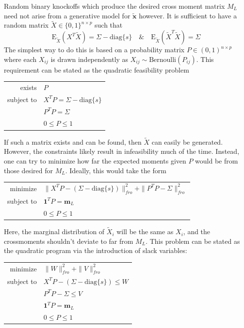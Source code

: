 \documentclass[11pt]{article}
\newcommand{\E}{\mathrm{E}}
\newcommand{\diag}[1]{\mathrm{diag}\{#1\}}
\theoremstyle{definition}
\begin{document}
        Random binary knockoffs which produce the desired cross moment matrix $M_L$ need not arise from a generative model for $\mathbf{\tilde x}$ however. It is sufficient to have a random matrix $\tilde X \in \{0,1\}^{n\times p}$ such that 
        \[ \E_{\tilde X}(X^T \tilde X) = \Sigma - \diag{s} \quad \& \quad \E_{\tilde X}(\tilde X^T \tilde X) = \Sigma\]
        The simplest way to do this is based on a probability matrix $P\in (0,1)^{n\times p}$ where each $X_{ij}$ is drawn independently as $X_{ij}\sim\textrm{Bernoulli}(P_{ij})$. This requirement can be stated as the quadratic feasibility problem
            \begin{center}
                \begin{tabular}{r l}
                    exists     & $P$ \\
                    subject to & $X^TP=\Sigma-\diag{s} $ \\
                               & $P^TP=\Sigma $ \\
                               & $0 \leq P \leq 1$
                \end{tabular} 
            \end{center}
        If such a matrix exists and can be found, then $\tilde X$ can easily be generated. However, the constraints likely result in infeasibility much of the time. Instead, one can try to minimize how far the expected moments given $P$ would be from those desired for $M_L$. Ideally, this would take the form
            \begin{center}
                \begin{tabular}{r l}
                    minimize     & $\|X^TP-(\Sigma-\diag{s})\|_{fro}^2 + \|P^TP-\Sigma\|_{fro}^2 $\\
                    subject to   & $ \mathbf 1^T P = \mathbf m_L $ \\
                                 & $0 \leq P \leq 1$
                \end{tabular} 
            \end{center}
            Here, the marginal distribution of $\tilde X_i$ will be the same as $X_i$, and the crossmoments shouldn't deviate to far from $M_L$. This problem can be stated as the quadratic program via the introduction of slack variables:
            \begin{center}
                \begin{tabular}{r l}
                    minimize     & $\|W\|_{fro}^2 + \|V\|_{fro}^2 $ \\
                    subject to   & $ X^TP-(\Sigma-\diag{s})\leq W $ \\
                                 & $ P^TP-\Sigma \leq V $ \\
                                 & $ \mathbf 1^T P = \mathbf m_L $ \\
                                 & $0 \leq P \leq 1$
                \end{tabular} 
            \end{center}
\end{document}
